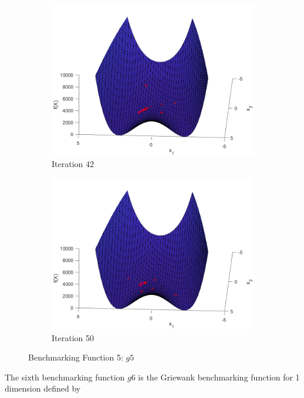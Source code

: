 \begin{figure}
\begin{subfigure}[b]{0.4\textwidth}
    \includegraphics[width=\textwidth]{img/smpl/rosn2d-1-100/loa-iter-42}
    \caption{Iteration 42}
    \label{fig:s5-iter-6}
  \end{subfigure}
  \begin{subfigure}[b]{0.4\textwidth}
    \includegraphics[width=\textwidth]{img/smpl/rosn2d-1-100/loa-iter-50}
    \caption{Iteration 50}
    \label{fig:s5-iter-7}
  \end{subfigure}
  \caption{Benchmarking Function 5: $g5$}
\end{figure}


\par The sixth benchmarking function $g6$ is the Griewank benchmarking function for 1 dimension defined by

